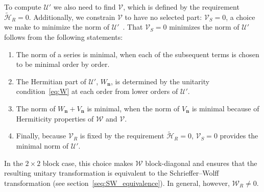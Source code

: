 To compute $\mathcal{U}'$ we also need to find $\mathcal{V}$, which is defined by the requirement $\tilde{\mathcal{H}}_{R} = 0$.
Additionally, we constrain $\mathcal{V}$ to have no selected part: $\mathcal{V}_{S} = 0$, a choice we make to minimize the norm of $\mathcal{U}'$~\cite{Cederbaum_1989}.
That $\mathcal{V}_{S} = 0$ minimizes the norm of $\mathcal{U}'$ follows from the following statements:
\begin{enumerate}
  \item The norm of a series is minimal, when each of the subsequent terms is chosen to be minimal order by order.
  \item The Hermitian part of $\mathcal{U}'$, $W_\mathbf{n}$, is determined by the unitarity condition~\eqref{eq:W} at each order from lower orders of $\mathcal{U}'$.
  \item The norm of $W_\mathbf{n} + V_\mathbf{n}$ is minimal, when the norm of $V_\mathbf{n}$ is minimal because of Hermiticity properties of $\mathcal{W}$ and $\mathcal{V}$.
  \item Finally, because $\mathcal{V}_{R}$ is fixed by the requirement $\tilde{\mathcal{H}}_{R} = 0$, $\mathcal{V}_{S}=0$ provides the minimal norm of $\mathcal{U}'$.
\end{enumerate}
In the $2\times 2$ block case, this choice makes $\mathcal{W}$ block-diagonal and ensures that the resulting unitary transformation is equivalent to the Schrieffer--Wolff transformation (see section~\ref{seq:SW_equivalence}).
In general, however, $\mathcal{W}_{R} \neq 0$.

